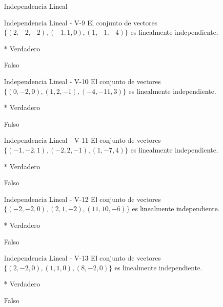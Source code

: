 \documentclass[a4,11pt]{aleph-notas}
\begin{document}
\begin{quiz}{Independencia Lineal}
\begin{multi}[numbering = none, shuffle = false]%
    {Independencia Lineal - V-9}
    El conjunto de vectores $\{ (2,-2,-2) , (-1,1,0), (1, -1, -4) \}$ es linealmente independiente.
    \item[]* Verdadero 
    \item[] Falso
\end{multi}

\begin{multi}[numbering = none, shuffle = false]%
    {Independencia Lineal - V-10}
    El conjunto de vectores $\{ (0,-2,0) , (1,2,-1), (-4, -11, 3) \}$ es linealmente independiente.
    \item[]* Verdadero 
    \item[] Falso
\end{multi}

\begin{multi}[numbering = none, shuffle = false]%
    {Independencia Lineal - V-11}
    El conjunto de vectores $\{ (-1,-2,1) , (-2,2,-1), (1, -7, 4) \}$ es linealmente independiente.
    \item[]* Verdadero 
    \item[] Falso
\end{multi}

\begin{multi}[numbering = none, shuffle = false]%
    {Independencia Lineal - V-12}
    El conjunto de vectores $\{ (-2,-2,0) , (2,1,-2), (11, 10, -6) \}$ es linealmente independiente.
    \item[]* Verdadero 
    \item[] Falso
\end{multi}

\begin{multi}[numbering = none, shuffle = false]%
    {Independencia Lineal - V-13}
    El conjunto de vectores $\{ (2,-2,0) , (1,1,0), (8, -2, 0) \}$ es linealmente independiente.
    \item[]* Verdadero 
    \item[] Falso
\end{multi}


\end{quiz}
\end{document}
